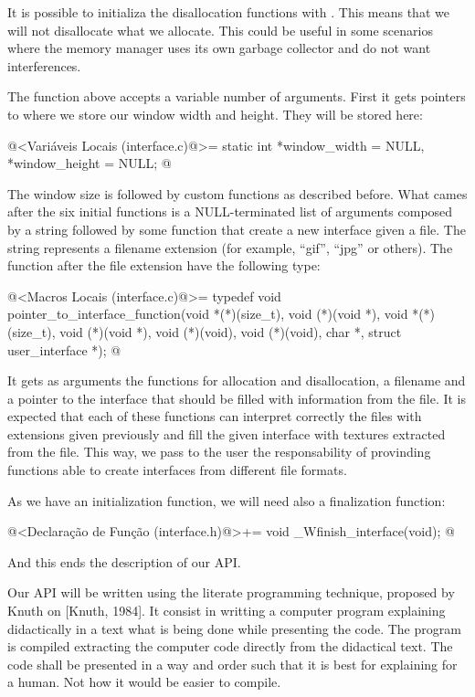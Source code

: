 It is possible to initializa the disallocation functions with
. This means that we will not disallocate what we
allocate. This could be useful in some scenarios where the memory
manager uses its own garbage collector and do not want interferences.

The function above accepts a variable number of arguments. First it
gets pointers to where we store our window width and height. They will
be stored here:

\iniciocodigo
@<Variáveis Locais (interface.c)@>=
static int *window_width = NULL, *window_height = NULL;
@
\fimcodigo

The window size is followed by custom functions as described before.
What cames after the six initial functions is a NULL-terminated list
of arguments composed by a string followed by some function that
create a new interface given a file. The string represents a filename
extension (for example, ``gif'', ``jpg'' or others). The function
after the file extension have the following type:

\iniciocodigo
@<Macros Locais (interface.c)@>=
typedef void pointer_to_interface_function(void *(*)(size_t), void (*)(void *),
                                          void *(*)(size_t), void (*)(void *),
                                          void (*)(void), void (*)(void),
                                          char *, struct user_interface *);
@
\fimcodigo


It gets as arguments the functions for allocation and disallocation, a
filename and a pointer to the interface that should be filled with
information from the file. It is expected that each of these functions
can interpret correctly the files with extensions given previously and
fill the given interface with textures extracted from the file. This
way, we pass to the user the responsability of provinding functions
able to create interfaces from different file formats.

As we have an initialization function, we will need also a
finalization function:

\iniciocodigo
@<Declaração de Função (interface.h)@>+=
void _Wfinish_interface(void);
@
\fimcodigo

And this ends the description of our API.


Our API will be written using the literate programming technique,
proposed by Knuth on [Knuth, 1984]. It consist in writting a computer
program explaining didactically in a text what is being done while
presenting the code. The program is compiled extracting the computer
code directly from the didactical text. The code shall be presented in
a way and order such that it is best for explaining for a human. Not
how it would be easier to compile.

